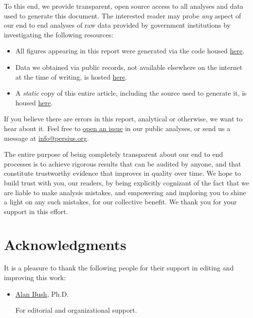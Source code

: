 \documentclass[12pt, a4paper,twoside,parskip=full]{report}
\theoremstyle{plain} %
\theoremstyle{definition} %
\theoremstyle{remark} %
\numberwithin{equation}{chapter}
\begin{document}
		
		To this end, we provide transparent, open source access to all analyses and data used to
		generate this document. The interested reader may probe \emph{any} aspect of our end to end 
		analyses of raw data provided by government institutions by investigating the following resources:
		
		\begin{itemize}
			\item All figures appearing in this report were
			generated via the code housed
			\href{https://github.com/TPAFS/investigations/tree/initial_denial_investigation/investigations/claims_denials}{here}.
			
			\item Data we obtained via public records, not available elsewhere on the internet at the time of writing, is hosted \href{https://github.com/TPAFS/public-records}{here}.
			
			\item A \emph{static} copy of this entire article, including the source used to generate it,
			is housed \href{https://github.com/TPAFS/investigations/tree/main/investigations/claims_denials/latex}{here}.
			
		\end{itemize}
		
		If you believe there are errors in this report, analytical or otherwise, we want to hear about it.
		Feel free to \href{https://github.com/TPAFS/investigations/issues}{open an issue}
		in our public analyses, or send us a message at \href{info@persius.org}{info@persius.org}.
		
		The entire purpose of being completely transparent about our end to end processes is to achieve rigorous 
		results that can be audited by anyone, and that constitute trustworthy evidence that improves in quality over
		time.  We hope to build trust with you, our readers,
		by being explicitly cognizant of the fact that we are liable to make analysis mistakes, and empowering and imploring
		you to shine a light on any such mistakes, for our collective benefit. We thank you for your support in this effort.
		
		\chapter{Acknowledgments}
		
		It is a pleasure to thank the following people for their support in editing
		and improving this work:
		
		\begin{itemize}
			\item \href{https://www.freerangeprofessor.com/}{Alan Bush}, Ph.D.
			
			For editorial and organizational support.
		\end{itemize}
		
\end{document}
